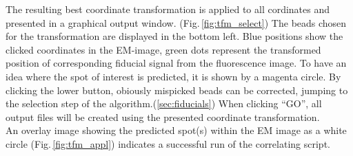 \documentclass[10pt,a4paper,onepage,DIV12]{scrartcl}
\begin{document}
% 

The resulting best coordinate transformation is applied to all cordinates and presented in a graphical output window. (Fig.\,\ref{fig:tfm_select}) The beads chosen for the transformation are displayed in the bottom left. Blue positions show the clicked coordinates in the EM-image, green dots represent the transformed position of corresponding fiducial signal from the fluorescence image. To have an idea where the spot of interest is predicted, it is shown by a magenta circle. By clicking the lower button, obiously mispicked beads can be corrected, jumping to the selection step of the algorithm.(\ref{sec:fiducials}) When clicking ``GO'', all output files will be created using the presented coordinate transformation.\\
An overlay image showing the predicted spot(s) within the EM image as a white circle (Fig.\,\ref{fig:tfm_appl}) indicates a successful run of the correlating script.
\end{document}
